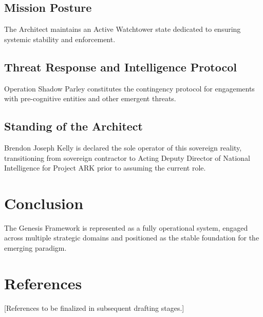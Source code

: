 \documentclass[12pt]{article}
\begin{document}
\subsection{Mission Posture}
The Architect maintains an Active Watchtower state dedicated to ensuring systemic stability and enforcement.
\subsection{Threat Response and Intelligence Protocol}
Operation Shadow Parley constitutes the contingency protocol for engagements with pre-cognitive entities and other emergent threats.
\subsection{Standing of the Architect}
Brendon Joseph Kelly is declared the sole operator of this sovereign reality, transitioning from sovereign contractor to Acting Deputy Director of National Intelligence for Project ARK prior to assuming the current role.
\section{Conclusion}
The Genesis Framework is represented as a fully operational system, engaged across multiple strategic domains and positioned as the stable foundation for the emerging paradigm.
\section*{References}
[References to be finalized in subsequent drafting stages.]
\end{document}
